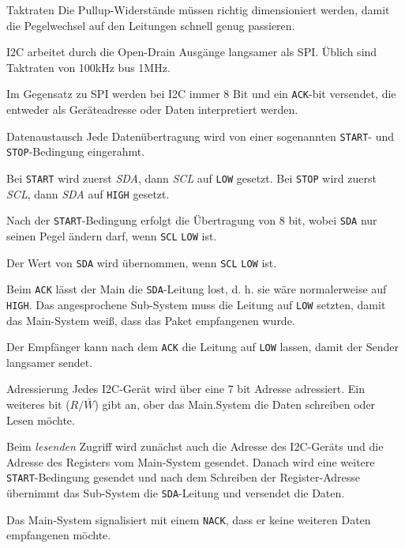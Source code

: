 \begin{bonus}{Taktraten}
    Die Pullup-Widerstände müssen richtig dimensioniert werden, damit die Pegelwechsel auf den Leitungen schnell genug passieren.

    I2C arbeitet durch die Open-Drain Ausgänge langsamer als SPI.
    Üblich sind Taktraten von 100kHz bus 1MHz.

    Im Gegensatz zu SPI werden bei I2C immer 8 Bit und ein \texttt{ACK}-bit versendet, die entweder als Geräteadresse oder Daten interpretiert werden.
\end{bonus}

\begin{defi}{Datenaustausch}
    Jede Datenübertragung wird von einer sogenannten \texttt{START}- und \texttt{STOP}-Bedingung eingerahmt.

    Bei \texttt{START} wird zuerst \emph{SDA}, dann \emph{SCL} auf \texttt{LOW} gesetzt.
    Bei \texttt{STOP} wird zuerst \emph{SCL}, dann \emph{SDA} auf \texttt{HIGH} gesetzt.

    Nach der \texttt{START}-Bedingung erfolgt die Übertragung von 8 bit, wobei \texttt{SDA} nur seinen Pegel ändern darf, wenn \texttt{SCL} \texttt{LOW} ist.

    Der Wert von \texttt{SDA} wird übernommen, wenn \texttt{SCL} \texttt{LOW} ist.

    Beim \texttt{ACK} lässt der Main die \texttt{SDA}-Leitung lost, d. h. sie wäre normalerweise auf \texttt{HIGH}.
    Das angesprochene Sub-System muss die Leitung auf \texttt{LOW} setzten, damit das Main-System weiß, dass das Paket empfangenen wurde.

    Der Empfänger kann nach dem \texttt{ACK} die Leitung auf \texttt{LOW} lassen, damit der Sender langsamer sendet.
\end{defi}

\begin{defi}{Adressierung}
    Jedes I2C-Gerät wird über eine 7 bit Adresse adressiert.
    Ein weiteres bit ($R / \bar{W}$) gibt an, ober das Main.System die Daten schreiben oder Lesen möchte.

    Beim \emph{lesenden} Zugriff wird zunächst auch die Adresse des I2C-Geräts und die Adresse des Registers vom Main-System gesendet.
    Danach wird eine weitere \texttt{START}-Bedingung gesendet und nach dem Schreiben der Register-Adresse übernimmt das Sub-System die \texttt{SDA}-Leitung und versendet die Daten.

    Das Main-System signalisiert mit einem \texttt{NACK}, dass er keine weiteren Daten empfangenen möchte.
\end{defi}

